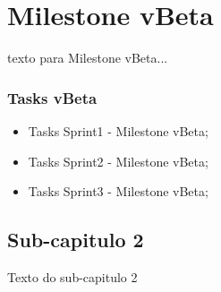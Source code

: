 
\chapter{Milestone vBeta}

texto para Milestone vBeta...


\subsection{Tasks vBeta}

\begin{itemize}
	\item Tasks Sprint1 - Milestone vBeta;
	\item Tasks Sprint2 - Milestone vBeta;
	\item Tasks Sprint3 - Milestone vBeta;
\end{itemize}


\section{Sub-capitulo 2}
Texto do sub-capitulo 2
